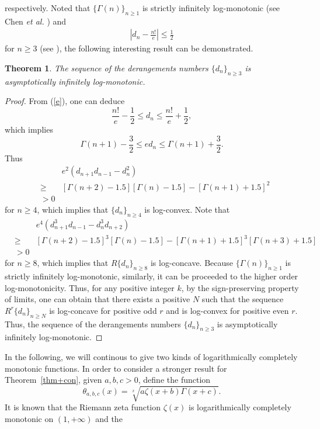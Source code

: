 \documentclass[12pt,reqno]{article}
\newtheorem{thm}{Theorem}[section]
\theoremstyle{definition}
\numberwithin{equation}{section}
\begin{document}
\cite{CGW} respectively. Noted that $\{\Gamma(n)\}_{n\geq1}$ is
strictly infinitely log-monotonic (see Chen {\it et al.}
\cite{CGW1}) and
\begin{eqnarray}\label{e} |d_{n}-\frac{n!}{e}|\leq\frac{1}{2}
\end{eqnarray} for $n\geq 3$ (see \cite{HSW12}),
the following interesting  result can be demonstrated.
\begin{thm}
The sequence of the derangements numbers $\{d_n\}_{n\ge 3}$ is
asymptotically infinitely log-monotonic.
\end{thm}
\begin{proof}
From (\ref{e}), one can deduce
$$\frac{n!}{e}-\frac{1}{2}\leq d_n\leq \frac{n!}{e}+\frac{1}{2},$$
which implies $$\Gamma(n+1)-\frac{3}{2}\leq e d_n\leq
\Gamma(n+1)+\frac{3}{2}.$$ Thus
\begin{eqnarray*}
&&e^2(d_{n+1}d_{n-1}-d_n^2)\\
&\geq&[\Gamma(n+2)-1.5][\Gamma(n)-1.5]-[\Gamma(n+1)+1.5]^2\\
&>0&
\end{eqnarray*}
for $n\ge4$, which implies that $\{d_n\}_{n\ge 4}$ is log-convex.
Note that \begin{eqnarray*}
&&e^4(d_{n+1}^3d_{n-1}-d_{n}^3d_{n+2})\\
&\geq&[\Gamma(n+2)-1.5]^3[\Gamma(n)-1.5]-[\Gamma(n+1)+1.5]^3[\Gamma(n+3)+1.5]\\
&>0&
\end{eqnarray*}
for $n\ge8$, which implies that $R\{d_n\}_{n\geq 8}$ is log-concave.
Because $\{\Gamma(n)\}_{n\geq1}$ is strictly infinitely
log-monotonic, similarly, it can be proceeded to the higher order
log-monotonicity. Thus, for any positive integer $k $, by the
sign-preserving property of limits, one can obtain that there exists
a positive $N$ such that the sequence $R^r\{d_n\}_{n\geq N}$ is
log-concave for positive odd $r$ and is log-convex for positive even
$r$. Thus, the sequence of the derangements numbers $\{d_n\}_{n\ge
3}$ is asymptotically infinitely log-monotonic.
\end{proof}
In the following, we will continous to give two kinds of
logarithmically completely monotonic functions. In order to consider
a stronger result for Theorem~\ref{thm+con}, given $a,b,c>0$, define
the function
$$\theta_{a,b,c}(x)=\sqrt[x]{a \zeta(x+b)\Gamma(x+c)}.$$
It is known that the Riemann zeta function $\zeta(x)$ is
logarithmically completely monotonic on $(1,+\infty)$ and the
\end{document}
